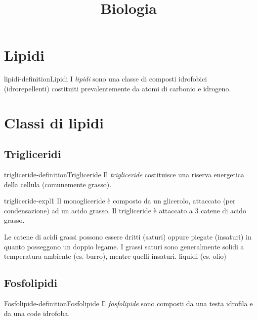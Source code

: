 \documentclass[preview]{standalone}
\begin{document}
\title{Biologia}
\genpage

\section{Lipidi}

\begin{snippetdefinition}{lipidi-definition}{Lipidi}
    I \textit{lipidi} sono una classe di composti idrofobici (idrorepellenti)
    costituiti prevalentemente da atomi di carbonio e idrogeno.
\end{snippetdefinition}


\section{Classi di lipidi}

\subsection{Trigliceridi}

\begin{snippetdefinition}{trigliceride-definition}{Trigliceride}
    Il \textit{trigliceride} costituisce una riserva energetica della cellula (comunemente grasso).
\end{snippetdefinition}

\begin{snippet}{trigliceride-expl1}
    Il monogliceride è composto da un glicerolo, attaccato (per condensazione) ad un acido grasso.
    Il trigliceride è attaccato a 3 catene di acido grasso.

    Le catene di acidi grassi possono essere dritti (saturi) oppure piegate (insaturi)
    in quanto posseggono un doppio legame.
    I grassi saturi sono generalmente solidi a temperatura ambiente (es. burro),
    mentre quelli insaturi. liquidi (es. olio)
\end{snippet}


\subsection{Fosfolipidi}

\begin{snippetdefinition}{Fosfolipide-definition}{Fosfolipide}
    Il \textit{fosfolipide} sono composti da una testa idrofila e da una code idrofoba.
\end{snippetdefinition}
\end{document}
